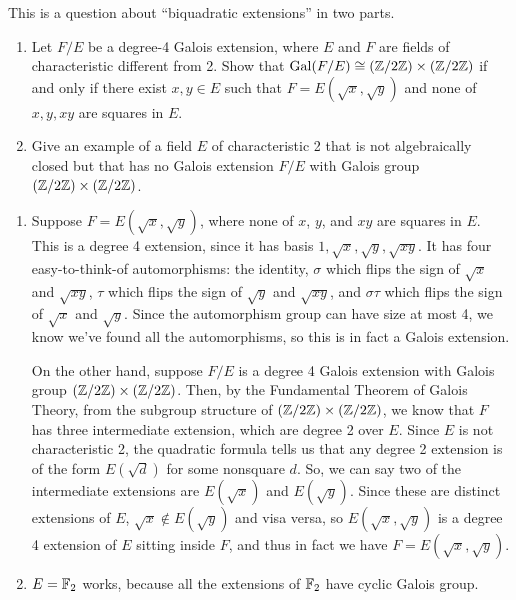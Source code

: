 %
\begin{question}[subtitle = January 2017 Problem 4,ID=Jan17_4]
This is a question about ``biquadratic extensions'' in two parts.
\begin{enumerate}
    \item Let $F/E$ be a degree-4 Galois extension, where $E$ and $F$ are fields of characteristic different from 2. Show that $\operatorname{Gal}(F/E) \cong (\mathbb{Z}/2\mathbb{Z}) \times (\mathbb{Z}/2\mathbb{Z})$ if and only if there exist $x,y \in E$ such that $F = E(\sqrt{x},\sqrt{y})$ and none of $x,y,xy$ are squares in $E$.
    \item Give an example of a field $E$ of characteristic 2 that is not algebraically closed but that has no Galois extension $F/E$ with Galois group $(\mathbb{Z}/2\mathbb{Z}) \times (\mathbb{Z}/2\mathbb{Z})$.
\end{enumerate}
\end{question}
\begin{solution}
\begin{enumerate}
    \item Suppose $F = E(\sqrt{x},\sqrt{y})$, where none of $x$, $y$, and $xy$ are squares in $E$. This is a degree 4 extension, since it has basis $1, \sqrt{x}, \sqrt{y}, \sqrt{xy}$. It has four easy-to-think-of automorphisms: the identity, $\sigma$ which flips the sign of $\sqrt{x}$ and $\sqrt{xy}$, $\tau$ which flips the sign of $\sqrt{y}$ and $\sqrt{xy}$, and $\sigma \tau$ which flips the sign of $\sqrt{x}$ and $\sqrt{y}$. Since the automorphism group can have size at most 4, we know we've found all the automorphisms, so this is in fact a Galois extension.
    
    On the other hand, suppose $F/E$ is a degree 4 Galois extension with Galois group $(\mathbb{Z}/2\mathbb{Z}) \times (\mathbb{Z}/2\mathbb{Z})$. Then, by the Fundamental Theorem of Galois Theory, from the subgroup structure of $(\mathbb{Z}/2\mathbb{Z}) \times (\mathbb{Z}/2\mathbb{Z})$, we know that $F$ has three intermediate extension, which are degree 2 over $E$. Since $E$ is not characteristic 2, the quadratic formula tells us that any degree 2 extension is of the form $E(\sqrt{d})$ for some nonsquare $d$. So, we can say two of the intermediate extensions are $E(\sqrt{x})$ and $E(\sqrt{y})$. Since these are distinct extensions of $E$, $\sqrt{x} \not\in E(\sqrt{y})$ and visa versa, so $E(\sqrt{x},\sqrt{y})$ is a degree 4 extension of $E$ sitting inside $F$, and thus in fact we have $F = E(\sqrt{x},\sqrt{y})$.
    
    \item $E = \mathbb{F}_2$ works, because all the extensions of $\mathbb{F}_2$ have cyclic Galois group.
\end{enumerate}
\end{solution}

